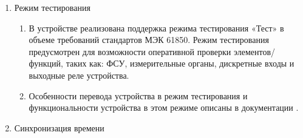 \begin{enumerate}[label=\arabic{section}.\arabic{subsection}.\arabic*, labelsep=4pt, leftmargin=0pt, itemindent=57pt]
\begin{enumerate}[label=\arabic{section}.\arabic{subsection}.\arabic{enumi}.\arabic*, labelsep=4pt, leftmargin=0em, itemindent=65pt, parsep=0pt]
\item
Максимальное число записей журнала -- 20000.
Каждая запись в журнал событий содержит в себе следующую информацию:
\begin{itemize}
\item дату и время возникновения события;
\item идентификатор события;
\item состояние дискретного или значение аналогового сигнала в момент события;
\item качество зарегистрированного параметра;
\item качество времени.
\end{itemize}

\item
Данные о событиях сохраняются в энергонезависимой памяти.
При заполнении журнала событий перезапись осуществляется от более старых событий к новым, то есть циклически.
Удаление информации из журнала событий пользователем невозможно.
Перечень сигналов, доступных для регистрации в журнале событий, приведен в приложении \ref{app:signals}.

\end{enumerate}

\item Режим тестирования
\begin{enumerate}[label=\arabic{section}.\arabic{subsection}.\arabic{enumi}.\arabic*, labelsep=4pt, leftmargin=0em, itemindent=65pt, parsep=0pt]

\item 
В устройстве реализована поддержка режима тестирования «Тест» в объеме требований стандартов МЭК 61850.
Режим тестирования предусмотрен для возможности оперативной проверки элементов/функций, таких как: ФСУ, измерительные органы, дискретные входы и выходные реле устройства.

\item 
Особенности перевода устройства в режим тестирования и функциональности устройства в этом режиме описаны в документации \ManualUnitGeneral.

\end{enumerate}

\item Синхронизация времени
\begin{enumerate}[label=\arabic{section}.\arabic{subsection}.\arabic{enumi}.\arabic*, labelsep=4pt, leftmargin=0em, itemindent=65pt, parsep=0pt]


\end{enumerate}
\end{enumerate}
